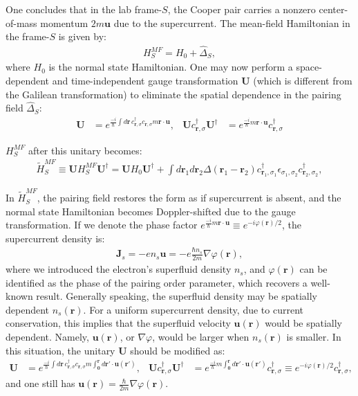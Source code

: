 \begin{subappendices}
One concludes that in the lab frame-$S$, the Cooper pair carries a nonzero center-of-mass momentum $2m\mathbf u$ due to the supercurrent. The mean-field Hamiltonian in the frame-$S$ is given by:
\begin{align}
	H^{MF}_{S}=H_0+\hat\Delta_{S},
\end{align}
where $H_0$ is the normal state Hamiltonian. One may now perform a space-dependent and time-independent gauge transformation $\mathbf U$ (which is different from the Galilean transformation) to eliminate the spatial dependence in the pairing field $\hat\Delta_S$:
\begin{align}
	\mathbf U &= e^{\frac{-i}{\hbar} \int d\mathbf r\,c^\dagger_{\mathbf r,\sigma} c_{\mathbf r,\sigma}m\mathbf r\cdot \mathbf u },& \mathbf U c^\dagger_{\mathbf r,\sigma} \mathbf U^\dagger&= e^{\frac{-i}{\hbar} m\mathbf r\cdot \mathbf u} c^\dagger_{\mathbf r,\sigma}
\end{align}

$H^{MF}_{S}$ after this unitary becomes:
\begin{align}
	\tilde H^{MF}_{S}\equiv \mathbf U H^{MF}_{S} \mathbf U^\dagger= \mathbf U H_0 \mathbf U^\dagger+\int d\mathbf r_1 d\mathbf r_2\Delta(\mathbf r_1-\mathbf r_2) c^\dagger_{\mathbf r_1,\sigma_1}\epsilon_{\sigma_1,\sigma_2} c^\dagger_{\mathbf r_2,\sigma_2},
\end{align}

In $\tilde H^{MF}_{S}$, the pairing field restores the form as if supercurrent is absent, and the normal state Hamiltonian becomes Doppler-shifted due to the gauge transformation. If we denote the phase factor $e^{\frac{-i}{\hbar}m\mathbf r\cdot\mathbf u}\equiv e^{-i\varphi(\mathbf r)/2}$, the supercurrent density is:
\begin{align}
	\mathbf J_s=-e n_s \mathbf u=-e  \frac{\hbar n_s}{2m} \nabla \varphi(\mathbf r),\label{eq:current_relation}
\end{align}
where we introduced the electron's superfluid density $n_s$, and $\varphi (\mathbf r)$ can be identified as the phase of the pairing order parameter, which recovers a well-known result. Generally speaking, the superfluid density may be spatially dependent $n_s(\mathbf r)$. For a uniform supercurrent density, due to current conservation, this implies that the superfluid velocity $\mathbf u(\mathbf r)$ would be spatially dependent. Namely, $\mathbf u(\mathbf r)$, or $\nabla \varphi$, would be larger when $n_s(\mathbf r)$ is smaller. In this situation, the unitary $\mathbf U$ should be modified as:
\begin{align}
	\mathbf U &= e^{\frac{-i}{\hbar} \int d\mathbf r\,c^\dagger_{\mathbf r,\sigma} c_{\mathbf r,\sigma}m \int_{\mathbf 0}^{\mathbf r} d\mathbf r'\cdot \mathbf u(\mathbf r') },& \mathbf U c^\dagger_{\mathbf r,\sigma} \mathbf U^\dagger&= e^{\frac{-i}{\hbar} m\int_{\mathbf 0}^{\mathbf r} d \mathbf r'\cdot \mathbf u(\mathbf r')} c^\dagger_{\mathbf r,\sigma}\equiv e^{-i\varphi(\mathbf r)/2}c^\dagger_{\mathbf r,\sigma},
\end{align}
and one still has $\mathbf u(\mathbf r)=\frac{\hbar}{2m}\nabla \varphi(\mathbf r)$.


\end{subappendices}
